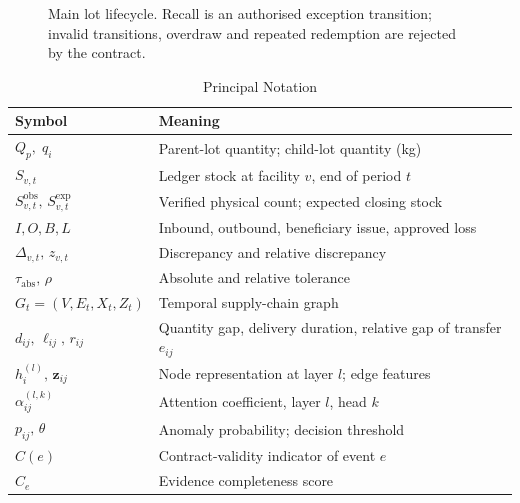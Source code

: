 \documentclass[conference,a4paper]{IEEEtran}
\begin{document}
\begin{figure}[!t]
\centering
{}
\caption{Main lot lifecycle. Recall is an authorised exception transition; invalid transitions, overdraw and repeated redemption are rejected by the contract.}
\label{fig:lifecycle}
\end{figure}

\begin{table}[!t]
\caption{Principal Notation}
\label{tab:notation}
\centering\footnotesize
\begin{tabularx}{\columnwidth}{@{}p{1.05in} X@{}}
\toprule
Symbol & Meaning\\
\midrule
$Q_p,\;q_i$ & Parent-lot quantity; child-lot quantity (kg)\\
$S_{v,t}$ & Ledger stock at facility $v$, end of period $t$\\
$S^{\mathrm{obs}}_{v,t},\,S^{\mathrm{exp}}_{v,t}$ & Verified physical count; expected closing stock\\
$I,O,B,L$ & Inbound, outbound, beneficiary issue, approved loss\\
$\Delta_{v,t},\,z_{v,t}$ & Discrepancy and relative discrepancy\\
$\tau_{\mathrm{abs}},\,\rho$ & Absolute and relative tolerance\\
$G_t=(V,E_t,X_t,Z_t)$ & Temporal supply-chain graph\\
$d_{ij},\,\ell_{ij},\,r_{ij}$ & Quantity gap, delivery duration, relative gap of transfer $e_{ij}$\\
$h_i^{(l)},\,\mathbf z_{ij}$ & Node representation at layer $l$; edge features\\
$\alpha_{ij}^{(l,k)}$ & Attention coefficient, layer $l$, head $k$\\
$p_{ij},\,\theta$ & Anomaly probability; decision threshold\\
$C(e)$ & Contract-validity indicator of event $e$\\
$C_e$ & Evidence completeness score\\
\bottomrule
\end{tabularx}
\end{table}
\end{document}
